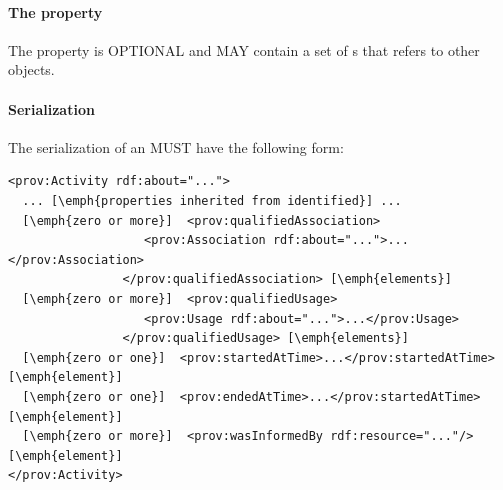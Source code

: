 {\paragraph{The  property}\label{sec:wasInformedBys}
The  property is OPTIONAL and MAY contain a set of s that refers to other  objects.

\paragraph{Serialization}
The serialization of an  MUST have the following form:
}

\begin{lstlisting}
<prov:Activity rdf:about="...">
  ... [\emph{properties inherited from identified}] ...
  [\emph{zero or more}]  <prov:qualifiedAssociation>
                   <prov:Association rdf:about="...">...</prov:Association>
                </prov:qualifiedAssociation> [\emph{elements}]
  [\emph{zero or more}]  <prov:qualifiedUsage>
                   <prov:Usage rdf:about="...">...</prov:Usage>
                </prov:qualifiedUsage> [\emph{elements}]             
  [\emph{zero or one}]  <prov:startedAtTime>...</prov:startedAtTime> [\emph{element}]
  [\emph{zero or one}]  <prov:endedAtTime>...</prov:startedAtTime> [\emph{element}] 
  [\emph{zero or more}]  <prov:wasInformedBy rdf:resource="..."/> [\emph{element}] 
</prov:Activity>
\end{lstlisting}


